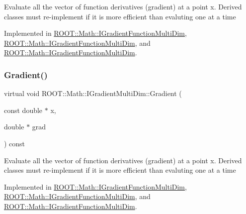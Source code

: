 Evaluate all the vector of function derivatives (gradient) at a point x. Derived classes must re-\/implement if it is more efficient than evaluting one at a time 

Implemented in \mbox{\hyperlink{classROOT_1_1Math_1_1IGradientFunctionMultiDim_ab65a713d2637c69b334d2119ef4f0e26}{R\+O\+O\+T\+::\+Math\+::\+I\+Gradient\+Function\+Multi\+Dim}}, \mbox{\hyperlink{classROOT_1_1Math_1_1IGradientFunctionMultiDim_ab65a713d2637c69b334d2119ef4f0e26}{R\+O\+O\+T\+::\+Math\+::\+I\+Gradient\+Function\+Multi\+Dim}}, and \mbox{\hyperlink{classROOT_1_1Math_1_1IGradientFunctionMultiDim_ab65a713d2637c69b334d2119ef4f0e26}{R\+O\+O\+T\+::\+Math\+::\+I\+Gradient\+Function\+Multi\+Dim}}.

\mbox{\label{classROOT_1_1Math_1_1IGradientMultiDim_ac5785e2df4fa36061bf9ddbb9ce4dde0}} 
\subsubsection{\texorpdfstring{Gradient()}{Gradient()}\hspace{0.1cm}{\footnotesize\ttfamily [2/3]}}
{\footnotesize\ttfamily virtual void R\+O\+O\+T\+::\+Math\+::\+I\+Gradient\+Multi\+Dim\+::\+Gradient (\begin{DoxyParamCaption}\item[{const double $\ast$}]{x,  }\item[{double $\ast$}]{grad }\end{DoxyParamCaption}) const\hspace{0.3cm}{\ttfamily [pure virtual]}}

Evaluate all the vector of function derivatives (gradient) at a point x. Derived classes must re-\/implement if it is more efficient than evaluting one at a time 

Implemented in \mbox{\hyperlink{classROOT_1_1Math_1_1IGradientFunctionMultiDim_ab65a713d2637c69b334d2119ef4f0e26}{R\+O\+O\+T\+::\+Math\+::\+I\+Gradient\+Function\+Multi\+Dim}}, \mbox{\hyperlink{classROOT_1_1Math_1_1IGradientFunctionMultiDim_ab65a713d2637c69b334d2119ef4f0e26}{R\+O\+O\+T\+::\+Math\+::\+I\+Gradient\+Function\+Multi\+Dim}}, and \mbox{\hyperlink{classROOT_1_1Math_1_1IGradientFunctionMultiDim_ab65a713d2637c69b334d2119ef4f0e26}{R\+O\+O\+T\+::\+Math\+::\+I\+Gradient\+Function\+Multi\+Dim}}.

